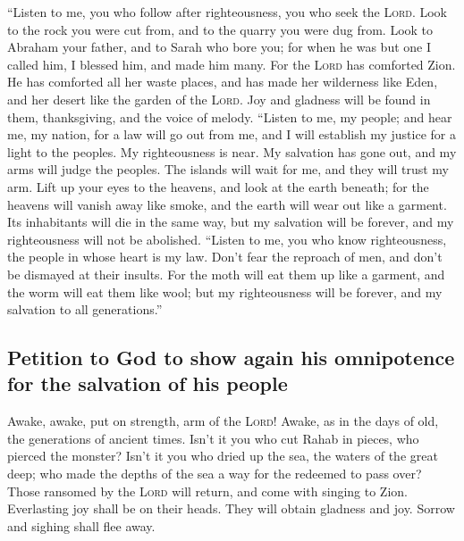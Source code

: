  ``Listen to me, you who follow after righteousness, you
who seek the \textsc{Lord}. Look to the rock you were cut from, and to
the quarry you were dug from.  Look to Abraham your
father, and to Sarah who bore you; for when he was but one I called him,
I blessed him, and made him many.  For the \textsc{Lord}
has comforted Zion. He has comforted all her waste places, and has made
her wilderness like Eden, and her desert like the garden of the
\textsc{Lord}. Joy and gladness will be found in them, thanksgiving, and
the voice of melody.  ``Listen to me, my people; and hear
me, my nation, for a law will go out from me, and I will establish my
justice for a light to the peoples.  My righteousness is
near. My salvation has gone out, and my arms will judge the peoples. The
islands will wait for me, and they will trust my arm. 
Lift up your eyes to the heavens, and look at the earth beneath; for the
heavens will vanish away like smoke, and the earth will wear out like a
garment. Its inhabitants will die in the same way, but my salvation will
be forever, and my righteousness will not be abolished. 
``Listen to me, you who know righteousness, the people in whose heart is
my law. Don't fear the reproach of men, and don't be dismayed at their
insults.  For the moth will eat them up like a garment,
and the worm will eat them like wool; but my righteousness will be
forever, and my salvation to all generations.''

\hypertarget{petition-to-god-to-show-again-his-omnipotence-for-the-salvation-of-his-people}{%
\subsection{Petition to God to show again his omnipotence for the
salvation of his
people}\label{petition-to-god-to-show-again-his-omnipotence-for-the-salvation-of-his-people}}

 Awake, awake, put on strength, arm of the \textsc{Lord}!
Awake, as in the days of old, the generations of ancient times. Isn't it
you who cut Rahab in pieces, who pierced the monster? 
Isn't it you who dried up the sea, the waters of the great deep; who
made the depths of the sea a way for the redeemed to pass over?
 Those ransomed by the \textsc{Lord} will return, and
come with singing to Zion. Everlasting joy shall be on their heads. They
will obtain gladness and joy. Sorrow and sighing shall flee away.

